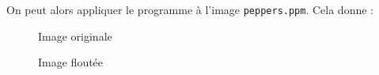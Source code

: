 \documentclass[french,a4paper,10pt]{article}
\begin{document}
    On peut alors appliquer le programme à l'image \texttt{peppers.ppm}.
    Cela donne :
    \begin{figure}[!htb]
        \begin{minipage}{0.48\textwidth}
            \centering
            \caption{Image originale}\label{Fig:peppers-1}
        \end{minipage}\hfill
        \begin{minipage}{0.48\textwidth}
            \centering
            \caption{Image floutée}\label{Fig:peppers-ff}
        \end{minipage}
    \end{figure}
\end{document}
